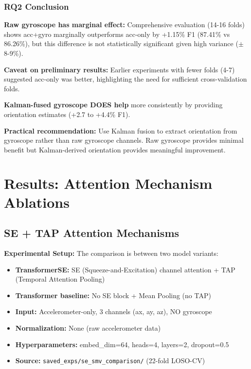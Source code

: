 \documentclass{article}
\begin{document}
\subsubsection{RQ2 Conclusion}

\begin{tcolorbox}[colback=green!5,colframe=green!50!black,title=\textbf{Answer to RQ2: Accelerometer-Only vs Accelerometer+Gyroscope}]
\textbf{Raw gyroscope has marginal effect:} Comprehensive evaluation (14-16 folds) shows acc+gyro marginally outperforms acc-only by +1.15\% F1 (87.41\% vs 86.26\%), but this difference is not statistically significant given high variance ($\pm$8-9\%).

\textbf{Caveat on preliminary results:} Earlier experiments with fewer folds (4-7) suggested acc-only was better, highlighting the need for sufficient cross-validation folds.

\textbf{Kalman-fused gyroscope DOES help} more consistently by providing orientation estimates (+2.7 to +4.4\% F1).

\textbf{Practical recommendation:} Use Kalman fusion to extract orientation from gyroscope rather than raw gyroscope channels. Raw gyroscope provides minimal benefit but Kalman-derived orientation provides meaningful improvement.
\end{tcolorbox}

\section{Results: Attention Mechanism Ablations}

\subsection{SE + TAP Attention Mechanisms}

\textbf{Experimental Setup:} The comparison is between two model variants:
\begin{itemize}
    \item \textbf{TransformerSE:} SE (Squeeze-and-Excitation) channel attention + TAP (Temporal Attention Pooling)
    \item \textbf{Transformer baseline:} No SE block + Mean Pooling (no TAP)
    \item \textbf{Input:} Accelerometer-only, 3 channels (ax, ay, az), NO gyroscope
    \item \textbf{Normalization:} None (raw accelerometer data)
    \item \textbf{Hyperparameters:} embed\_dim=64, heads=4, layers=2, dropout=0.5
    \item \textbf{Source:} \texttt{saved\_exps/se\_smv\_comparison/} (22-fold LOSO-CV)
\end{itemize}
\end{document}
